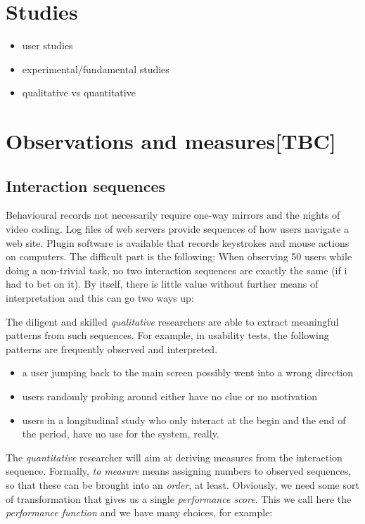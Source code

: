 \documentclass[]{svmono}
\providecommand{\tightlist}{%
  \setlength{\itemsep}{0pt}\setlength{\parskip}{0pt}}
\begin{document}
\section{Studies}\label{studies}

\begin{itemize}
\tightlist
\item
  user studies
\item
  experimental/fundamental studies
\item
  qualitative vs quantitative
\end{itemize}

\section{Observations and
measures{[}TBC{]}}\label{observations-and-measurestbc}

\subsection{Interaction sequences}\label{interaction-sequences}

Behavioural records not necessarily require one-way mirrors and the
nights of video coding. Log files of web servers provide sequences of
how users navigate a web site. Plugin software is available that records
keystrokes and mouse actions on computers. The difficult part is the
following: When observing 50 users while doing a non-trivial task, no
two interaction sequences are exactly the same (if i had to bet on it).
By itself, there is little value without further means of interpretation
and this can go two ways up:

The diligent and skilled \emph{qualitative} researchers are able to
extract meaningful patterns from such sequences. For example, in
usability tests, the following patterns are frequently observed and
interpreted.

\begin{itemize}
\tightlist
\item
  a user jumping back to the main screen possibly went into a wrong
  direction
\item
  users randomly probing around either have no clue or no motivation
\item
  users in a longitudinal study who only interact at the begin and the
  end of the period, have no use for the system, really.
\end{itemize}

The \emph{quantitative} researcher will aim at deriving measures from
the interaction sequence. Formally, \emph{to measure} means assigning
numbers to observed sequences, so that these can be brought into an
\emph{order}, at least. Obviously, we need some sort of transformation
that gives us a single \emph{performance score}. This we call here the
\emph{performance function} and we have many choices, for example:
\end{document}

